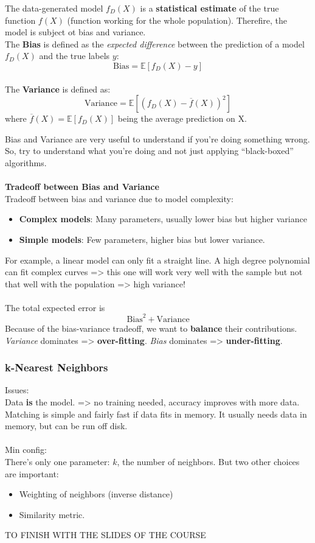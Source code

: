 The data-generated model $f_D(X)$ is a \textbf{statistical estimate} of the true function $f(X)$ (function working for the whole population). Therefire, the model is subject ot bias and variance. 
\\
The \textbf{Bias} is defined as the \emph{expected difference} between the prediction of a model $f_D(X)$ and the true labels $y$:
\[
 \textrm{Bias} = \mathbb{E}\left[ f_D(X)-y\right]
\]
\\
The \textbf{Variance} is defined as:
\[
 \textrm{Variance} = \mathbb{E}\left[\left(f_D(X) - \overline{f}(X)\right)^2\right]
\]
where $\overline{f}(X) = \mathbb{E}\left[f_D(X)\right]$ being the average prediction on X.

Bias and Variance are very useful to understand if you're doing something wrong. So, try to understand what you're doing and not just applying ``black-boxed'' algorithms.
\\\\
\textbf{Tradeoff between Bias and Variance}
\\
Tradeoff between bias and variance due to model complexity:
\begin{itemize}
 \item \textbf{Complex models}: Many parameters, usually lower bias but higher variance
 \item \textbf{Simple models}: Few parameters, higher bias but lower variance.
\end{itemize}

For example, a linear model can only fit a straight line. A high degree polynomial can fit complex curves => this one will work very well with the sample but not that well with the population => high variance!
\\\\
The total expected error is 
\[
 \textrm{Bias}^2 + \textrm{Variance}
\]
Because of the bias-variance tradeoff, we want to \textbf{balance} their contributions. \emph{Variance} dominates => \textbf{over-fitting}. \emph{Bias} dominates => \textbf{under-fitting}.

\subsubsection{k-Nearest Neighbors}
Issues: \\
Data \textbf{is} the model. => no training needed, accuracy improves with more data. Matching is simple and fairly fast if data fits in memory. It usually needs data in memory, but can be run off disk. 
\\\\
Min config: \\
There's only one parameter: $k$, the number of neighbors. But two other choices are important:
\begin{itemize}
 \item Weighting of neighbors (inverse distance)
 \item Similarity metric.
\end{itemize}

{\huge \color{red} TO FINISH WITH THE SLIDES OF THE COURSE}
